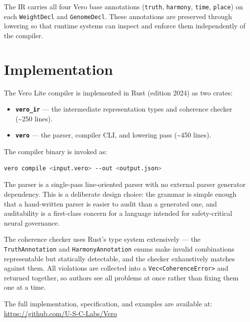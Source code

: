 \documentclass[11pt,a4paper]{article}
\begin{document}
The IR carries all four Vero base annotations (\texttt{truth}, \texttt{harmony},
\texttt{time}, \texttt{place}) on each \texttt{WeightDecl} and \texttt{GenomeDecl}.
These annotations are preserved through lowering so that runtime systems can inspect
and enforce them independently of the compiler.

\section{Implementation}
\label{sec:implementation}

The Vero Lite compiler is implemented in Rust (edition 2024) as two crates:

\begin{itemize}
  \item \textbf{\texttt{vero\_ir}} --- the intermediate representation types and
        coherence checker (\textasciitilde{}250 lines).
  \item \textbf{\texttt{vero}} --- the parser, compiler CLI, and lowering pass
        (\textasciitilde{}450 lines).
\end{itemize}

The compiler binary is invoked as:

\begin{lstlisting}[language=bash]
vero compile <input.vero> --out <output.json>
\end{lstlisting}

The parser is a single-pass line-oriented parser with no external parser generator
dependency. This is a deliberate design choice: the grammar is simple enough that a
hand-written parser is easier to audit than a generated one, and auditability is a
first-class concern for a language intended for safety-critical neural governance.

The coherence checker uses Rust's type system extensively --- the \texttt{TruthAnnotation}
and \texttt{HarmonyAnnotation} enums make invalid combinations representable but
statically detectable, and the checker exhaustively matches against them. All violations
are collected into a \texttt{Vec<CoherenceError>} and returned together, so authors see
all problems at once rather than fixing them one at a time.

The full implementation, specification, and examples are available at:\\
\url{https://github.com/U-S-C-Labs/Vero}
\end{document}
